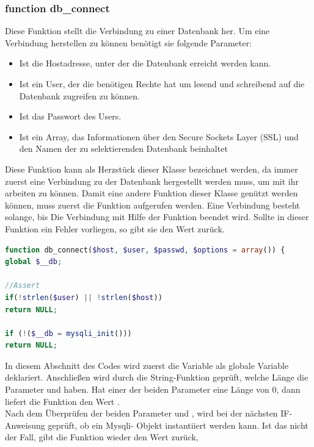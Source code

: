 \subsubsection{function db\_connect}
Diese Funktion stellt die Verbindung zu einer Datenbank her. Um eine Verbindung herstellen zu können benötigt sie folgende Parameter:
	\begin{itemize}
		\item {} Ist die Hostadresse, unter der die Datenbank erreicht werden kann.
		\item {} Ist ein User, der die benötigen Rechte hat um lesend und schreibend auf die Datenbank zugreifen zu können.
		\item {} Ist das Passwort des Users.
		\item {} Ist ein Array, das Informationen über den Secure Sockets Layer (SSL) und den Namen der zu selektierenden Datenbank beinhaltet
	\end{itemize}
Diese Funktion kann als Herzstück dieser Klasse bezeichnet werden, da immer zuerst eine Verbindung zu der Datenbank hergestellt werden muss, um mit ihr arbeiten zu können. Damit eine andere Funktion dieser Klasse genützt werden können, muss zuerst die Funktion  aufgerufen werden.
Eine Verbindung besteht solange, bis Die Verbindung mit Hilfe der Funktion  beendet wird.
Sollte in dieser Funktion ein Fehler vorliegen, so gibt sie den Wert  zurück.
\newpage

\begin{lstlisting}[language=PHP, caption=mysqli.php/function-db\_connect1, firstnumber=21]
function db_connect($host, $user, $passwd, $options = array()) {
global $__db;

//Assert
if(!strlen($user) || !strlen($host))
return NULL;

if (!($__db = mysqli_init()))
return NULL;
\end{lstlisting}

In diesem Abschnitt des Codes wird zuerst die Variable  als globale Variable deklariert. Anschließen wird durch die String-Funktion  geprüft, welche Länge die Parameter  und  haben. Hat einer der beiden Parameter eine Länge von 0, dann liefert die Funktion den Wert .\\
Nach dem Überprüfen der beiden Parameter  und , wird bei der nächsten IF-Anweisung geprüft, ob ein Mysqli- Objekt instantiiert werden kann. Ist das nicht der Fall, gibt die Funktion wieder den Wert  zurück,

